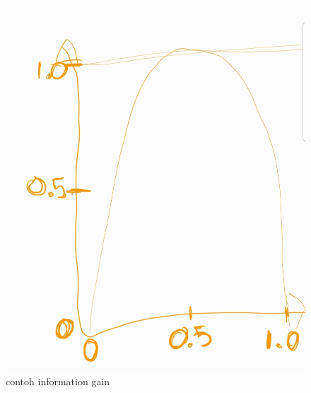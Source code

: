 \begin{enumerate}
\begin{figure}[H]
    \includegraphics[scale=0.2]{figures/1174035/chapter2/entropi.jpeg}
    \caption{contoh information gain}
    \label{contoh}
    \end{figure}
\end{enumerate}

